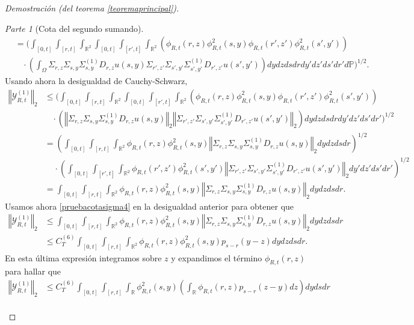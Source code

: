 \documentclass[letterpaper,twoside,12pt]{book}
\newcommand{\R}{\mathbb{R}}
\renewcommand{\P}{\mathbb{P}}
\newcommand{\1}{\mathds{1}}
\newcommand{\norm}[1]{\left\Vert #1 \right\Vert}
\theoremstyle{definition}
\theoremstyle{definition}
\theoremstyle{remark}
\newtheorem{proofpart}{Parte}
\theoremstyle{definition}
\theoremstyle{definition}
\theoremstyle{definition}
\theoremstyle{definition}
\theoremstyle{definition}
\begin{document}
\begin{proof}[Demostración (del teorema \ref{teoremaprincipal})]
\begin{proofpart}[Cota del segundo sumando]
\begin{align*}
   &=\Bigg(\int_{[0,t]}\int_{[r,t]}\int_{\R^2}\int_{[0,t]}\int_{[r',t]}\int_{\R^2}\left(\phi_{R,t}(r,z)\phi_{R,t}^2(s,y)\phi_{R,t}(r',z')\phi_{R,t}^2(s',y')\right)\\
   &\ \ \ \ \cdot \left(\int_\Omega\Sigma_{r,z}\Sigma_{s,y}\Sigma^{(1)}_{s,y}D_{r,z}u(s,y)\Sigma_{r',z'}\Sigma_{s',y'}\Sigma^{(1)}_{s',y'}D_{r',z'}u(s',y')\right) dy dz ds dr dy'dz'ds'dr'd\P\Bigg)^{1/2}.
 \end{align*}
 Usando ahora la desigualdad de Cauchy-Schwarz, 
 \begin{align*}
   \norm{\mathcal{Y}_{R,t}^{(1)}}_2&\leq \Bigg(\int_{[0,t]}\int_{[r,t]}\int_{\R^2}\int_{[0,t]}\int_{[r',t]}\int_{\R^2}\left(\phi_{R,t}(r,z)\phi_{R,t}^2(s,y)\phi_{R,t}(r',z')\phi_{R,t}^2(s',y')\right)\\
   &\ \ \ \ \cdot \left(\norm{\Sigma_{r,z}\Sigma_{s,y}\Sigma^{(1)}_{s,y}D_{r,z}u(s,y)}_2\norm{\Sigma_{r',z'}\Sigma_{s',y'}\Sigma^{(1)}_{s',y'}D_{r',z'}u(s',y')}_2\right) dy dz ds dr dy' dz' ds' dr'\Bigg)^{1/2}\\
   &=\left(\int_{[0,t]}\int_{[r,t]}\int_{\R^2}\phi_{R,t}(r,z)\phi_{R,t}^2(s,y)\norm{\Sigma_{r,z}\Sigma_{s,y}\Sigma^{(1)}_{s,y}D_{r,z}u(s,y)}_2dy dz ds dr\right)^{1/2}\\
   & \ \ \ \ \ \cdot \left(\int_{[0,t]}\int_{[r',t]}\int_{\R^2}\phi_{R,t}(r',z')\phi_{R,t}^2(s',y')\norm{\Sigma_{r',z'}\Sigma_{s',y'}\Sigma^{(1)}_{s',y'}D_{r',z'}u(s',y')}_2dy'dz'ds'dr'\right)^{1/2}\\
   &=\int_{[0,t]}\int_{[r,t]}\int_{\R^2}\phi_{R,t}(r,z)\phi_{R,t}^2(s,y)\norm{\Sigma_{r,z}\Sigma_{s,y}\Sigma^{(1)}_{s,y}D_{r,z}u(s,y)}_2dy dz ds dr.
 \end{align*}
 Usamos ahora \eqref{pruebacotasigma4} en la desigualdad anterior para obtener que
 \begin{align*}
   \norm{\mathcal{Y}_{R,t}^{(1)}}_2&\leq\int_{[0,t]}\int_{[r,t]}\int_{\R^2}\phi_{R,t}(r,z)\phi_{R,t}^2(s,y)\norm{\Sigma_{r,z}\Sigma_{s,y}\Sigma^{(1)}_{s,y}D_{r,z}u(s,y)}_2dy dz ds dr\\
   &\leq C^{(6)}_T\int_{[0,t]}\int_{[r,t]}\int_{\R^2}\phi_{R,t}(r,z)\phi_{R,t}^2(s,y)p_{s-r}(y-z)dy dz ds dr.
\end{align*}
En esta última expresión integramos sobre $z$ y expandimos el término $\phi_{R,t}(r,z)$ para hallar que 
\begin{align*}
   \norm{\mathcal{Y}_{R,t}^{(1)}}_2&\leq C^{(6)}_T\int_{[0,t]}\int_{[r,t]}\int_{\R}\phi_{R,t}^2(s,y)\left(\int_\R\phi_{R,t}(r,z)p_{s-r}(z-y)dz\right)dy ds dr\\

\end{align*}
\end{proofpart}
\end{proof}
\end{document}
